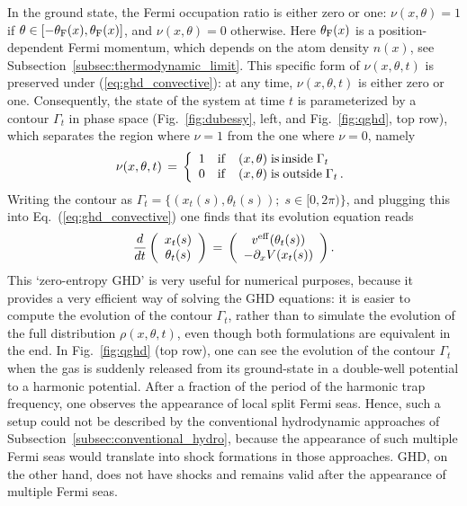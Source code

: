 \documentclass[onecolumn,amsfonts,showpacs,superscriptaddress]{revtex4-1}
\begin{document}
In the ground state, the Fermi occupation ratio is either zero or one: $\nu(x,\theta) = 1 $ if $\theta \in [-\theta_{\rm F}(x),\theta_{\rm F}(x) ]$, and $\nu(x,\theta) = 0$ otherwise. Here $\theta_{\rm F}(x)$ is a position-dependent Fermi momentum, which depends on the atom density $n(x)$, see Subsection~\ref{subsec:thermodynamic_limit}. This specific form of $\nu(x,\theta,t)$ is preserved under (\ref{eq:ghd_convective}): at any time, $\nu(x,\theta,t)$ is either zero or one. Consequently, the state of the system at time $t$ is parameterized by a contour $\Gamma_t$ in phase space (Fig.~\ref{fig:dubessy}, left, and Fig.~\ref{fig:qghd}, top row), which separates the region where $\nu = 1$ from the one where $\nu = 0$, namely
\begin{equation}
    \nu(x,\theta,t) \, = \, \left\{ \begin{array}{rcl}
        1 &{\rm if}& (x,\theta)  \; {\rm is \, inside } \; \Gamma_t \\
        0 &{\rm if}& (x,\theta)  \; {\rm is \; outside } \; \Gamma_t  \, .
    \end{array} \right. 
\end{equation}
Writing the contour as $\Gamma_t = \{(x_t(s), \theta_t (s)) ; \; s \in [0,2\pi) \}$, and plugging this into Eq.~(\ref{eq:ghd_convective}) one finds that its evolution equation reads
\begin{equation}
    \label{eq:zero_entropy_ghd}
    \frac{d}{dt} \left( \begin{array}{c}
            x_t (s)  \\
        \theta_t (s)  
    \end{array}
    \right) \, = \, \left( \begin{array}{c}
            v^{\rm eff} ( \theta_t (s) )  \\
        - \partial_x V(x_t(s)) 
    \end{array}
    \right) .
\end{equation}
This `zero-entropy GHD' \citep{doyon2017large} is very useful for numerical purposes, because it provides a very efficient way of solving the GHD equations: it is easier to compute the evolution of the contour $\Gamma_t$, rather than to simulate  the evolution of the full distribution $\rho(x,\theta, t)$, even though both formulations are equivalent in the end. In Fig.~\ref{fig:qghd} (top row), one can see the evolution of the contour $\Gamma_t$ when the gas is suddenly released from its ground-state in a double-well potential to a harmonic potential. After a fraction of the period of the harmonic trap frequency, one observes the appearance of local split Fermi seas. Hence, such a setup could not be described by the conventional hydrodynamic approaches of Subsection~\ref{subsec:conventional_hydro}, because the appearance of such multiple Fermi seas would translate into shock formations in those approaches. GHD, on the other hand, does not have shocks \citep{el2005kinetic,bulchandani2017classical,doyon2017large} and remains valid after the appearance of multiple Fermi seas.
\end{document}
